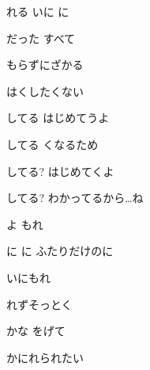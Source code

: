 \documentclass[14pt]{ltjsarticle}
\begin{document}
{  れる いに に
  \jisho{}

  だった すべて
  \jisho{}

  もらずにざかる
  \jisho{}

  はくしたくない
  \jisho{}

\item
  してる はじめてうよ
  \jisho{}

  してる くなるため
  \jisho{}

  してる? はじめてくよ
  \jisho{}

  してる? わかってるから…ね
  \jisho{}

\item
  よ もれ
  \jisho{}

  に に ふたりだけのに
  \jisho{}

  いにもれ
  \jisho{}

  れずそっとく
  \jisho{}

  かな をげて
  \jisho{}

  かにれられたい
  \jisho{}

  
}
\end{document}
